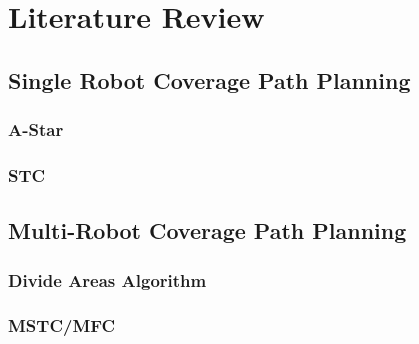 \chapter{Literature Review}
\label{chp:back}



\section{Single Robot Coverage Path Planning}

\subsection{A-Star}
\subsection{STC}
\section{Multi-Robot Coverage Path Planning}

\subsection{Divide Areas Algorithm}
\subsection{MSTC/MFC}





